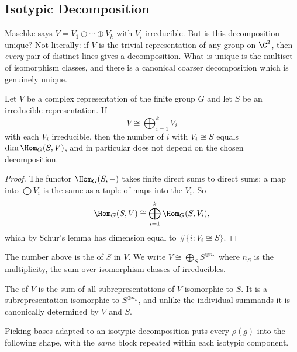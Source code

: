 \subsection{Isotypic Decomposition}

Maschke says $V = V_1 \oplus \cdots \oplus V_k$ with $V_i$ irreducible. But is this decomposition unique? Not literally: if $V$ is the trivial representation of any group on $\C^2$, then \emph{every} pair of distinct lines gives a decomposition. What is unique is the multiset of isomorphism classes, and there is a canonical coarser decomposition which is genuinely unique.

\begin{proposition}
	Let $V$ be a complex representation of the finite group $G$ and let $S$ be an irreducible representation. If
	$$V \cong \bigoplus_{i=1}^k V_i$$
	with each $V_i$ irreducible, then the number of $i$ with $V_i \cong S$ equals $\dim \Hom_G(S, V)$, and in particular does not depend on the chosen decomposition.
\end{proposition}
\begin{proof}
	The functor $\Hom_G(S, -)$ takes finite direct sums to direct sums: a map into $\bigoplus V_i$ is the same as a tuple of maps into the $V_i$. So
	$$\Hom_G(S,V) \cong \bigoplus_{i=1}^k \Hom_G(S,V_i),$$
	which by Schur's lemma has dimension equal to $\#\{i : V_i \cong S\}$.
\end{proof}

\begin{definition}[Multiplicity]
	The number above is the  of $S$ in $V$. We write $V \cong \bigoplus_S S^{\oplus n_S}$ where $n_S$ is the multiplicity, the sum over isomorphism classes of irreducibles.
\end{definition}

\begin{definition}
	The  of $V$ is the sum of all subrepresentations of $V$ isomorphic to $S$. It is a subrepresentation isomorphic to $S^{\oplus n_S}$, and unlike the individual summands it is canonically determined by $V$ and $S$.
\end{definition}

Picking bases adapted to an isotypic decomposition puts every $\rho(g)$ into the following shape, with the \emph{same} block repeated within each isotypic component.

